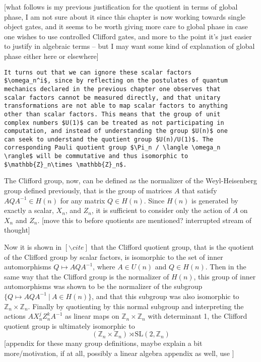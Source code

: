\documentclass[]{article}
\begin{document}
[what follows is my previous justification for the quotient in terms of global phase, I am not sure about it since this chapter is now working towards single object gates, and it seems to be worth giving more care to global phase in case one wishes to use controlled Clifford gates, and more to the point it's just easier to justify in algebraic terms -- but I may want some kind of explanation of global phase either here or elsewhere]
\begin{verbatim}
It turns out that we can ignore these scalar factors 
$\omega_n^i$, since by reflecting on the postulates of quantum 
mechanics declared in the previous chapter one observes that 
scalar factors cannot be measured directly, and that unitary 
transformations are not able to map scalar factors to anything 
other than scalar factors. This means that the group of unit 
complex numbers $U(1)$ can be treated as not participating in 
computation, and instead of understanding the group $U(n)$ one 
can seek to understand the quotient group $U(n)/U(1)$. The 
corresponding Pauli quotient group $\Pi_n / \langle \omega_n 
\rangle$ will be commutative and thus isomorphic to 
$\mathbb{Z}_n\times \mathbb{Z}_n$.
\end{verbatim}

The Clifford group, now, can be defined as the normalizer of the Weyl-Heisenberg group defined previously, that is the group of matrices $A$ that satisfy $AQA^{-1} \in H(n)$ for any matrix $Q \in H(n)$. Since $H(n)$ is generated by exactly a scalar, $X_n$, and $Z_n$, it is sufficient to consider only the action of $A$ on $X_n$ and $Z_n$. [move this to before quotients are mentioned? interrupted stream of thought]

Now it is shown in $[\backslash cite]$ that the Clifford quotient group, that is the quotient of the Clifford group by scalar factors, is isomorphic to the set of inner automorphisms $Q \mapsto AQA^{-1}$, where $A \in U(n)$ and $Q \in H(n)$. Then in the same way that the Clifford group is the normalizer of $H(n)$, this group of inner automorphisms was shown to be the normalizer of the subgroup $\{Q \mapsto AQA^{-1}\ |\ A \in H(n)\}$, and that this subgroup was also isomorphic to $\mathbb{Z}_n\times\mathbb{Z}_n$. Finally by quotienting by this normal subgroup and interpreting the actions $AX_n^jZ_n^kA^{-1}$ as linear maps on $\mathbb{Z}_n\times\mathbb{Z}_n$ with determinant 1, the Clifford quotient group is ultimately isomorphic to \[(\mathbb{Z}_n\times\mathbb{Z}_n)\rtimes\text{SL}(2,\mathbb{Z}_n)\]
[appendix for these many group definitions, maybe explain a bit more/motivation, if at all, possibly a linear algebra appendix as well, use ]
\end{document}
